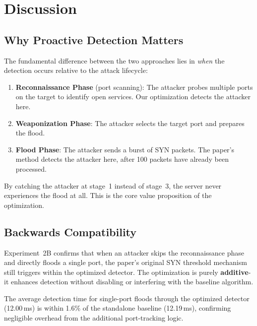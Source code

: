 \documentclass[12pt, a4paper]{article}
\begin{document}
\newpage

\section{Discussion}

\subsection{Why Proactive Detection Matters}

The fundamental difference between the two approaches lies in \textit{when} the detection occurs relative to the attack lifecycle:

\begin{enumerate}[itemsep=3pt]
    \item \textbf{Reconnaissance Phase} (port scanning): The attacker probes multiple ports on the target to identify open services. Our optimization detects the attacker here.
    \item \textbf{Weaponization Phase}: The attacker selects the target port and prepares the flood.
    \item \textbf{Flood Phase}: The attacker sends a burst of SYN packets. The paper's method detects the attacker here, after 100 packets have already been processed.
\end{enumerate}

By catching the attacker at stage~1 instead of stage~3, the server never experiences the flood at all. This is the core value proposition of the optimization.

\subsection{Backwards Compatibility}

Experiment~2B confirms that when an attacker skips the reconnaissance phase and directly floods a single port, the paper's original SYN threshold mechanism still triggers within the optimized detector. The optimization is purely \textbf{additive}-it enhances detection without disabling or interfering with the baseline algorithm.

The average detection time for single-port floods through the optimized detector (12.00\,ms) is within 1.6\% of the standalone baseline (12.19\,ms), confirming negligible overhead from the additional port-tracking logic.
\end{document}
